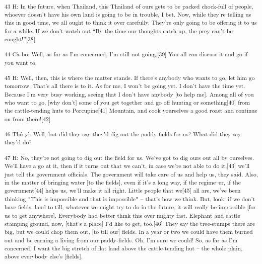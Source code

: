 {\textsuperscript{43 H: In the future, when Thailand, this Thailand of ours
gets to be packed chock-full of people, whoever doesn't have his own land is going
to be in trouble, I bet. Now, while they're telling us this in good time, we all
ought to think it over carefully. They're only going to be offering it to us for
a while. If we don't watch out ``By the time our thoughts catch up, the prey can't
be caught!''[38]}}

{\textsuperscript{44 Cà-bo: Well, as far as I'm concerned, I'm still not
going.[39] You all can discuss it and go if you want to. }}

{\textsuperscript{45 H: Well, then, this is where the matter stands. If
there's anybody who wants to go, let him go tomorrow. That's all there is to it.
As for me, I won't be going yet. I don't have the time yet. Because I'm very busy
working, seeing that I don't have anybody [to help me]. Among all of you who want
to go, [why don't] some of you get together and go off hunting or something[40]
from the cattle-tending huts to Porcupine[41] Mountain, and cook yourselves a good
roast and continue on from there![42]}}

{\textsuperscript{46 Thû-yì: Well, but did they say they'd dig out the
paddy-fields for us? What did they say they'd do? }}

{\textsuperscript{47 H: No, they're not going to dig out the field for us.
We've got to dig ours out all by ourselves. We'll have a go at it, then if it turns
out that we can't, in case we're not able to do it,[43] we'll just tell the government
officials. The government will take care of us and help us, they said. Also, in
the matter of bringing water [to the fields], even if it's a long way, if the regime--er,
if the government[44] helps us, we'll make it all right. Little people that we[45]
all are, we've been thinking \texttt{"}This is impossible and that is impossible\texttt{"}
-- that's how we think. But, look, if we don't have fields, land to till, whatever
we might try to do in the future, it will really be impossible [for us to get anywhere].
Everybody had better think this over mighty fast. Elephant and cattle stamping
ground, now, [that's a place] I'd like to get, too.[46] They say the tree-stumps
there are big, but we could chop them out, [to till our] fields. In a year or two
we could have them burned out and be earning a living from our paddy-fields. Oh,
I'm sure we could! So, as far as I'm concerned, I want the big stretch of flat
land above the cattle-tending hut -- the whole plain, above everybody else's [fields].}}

